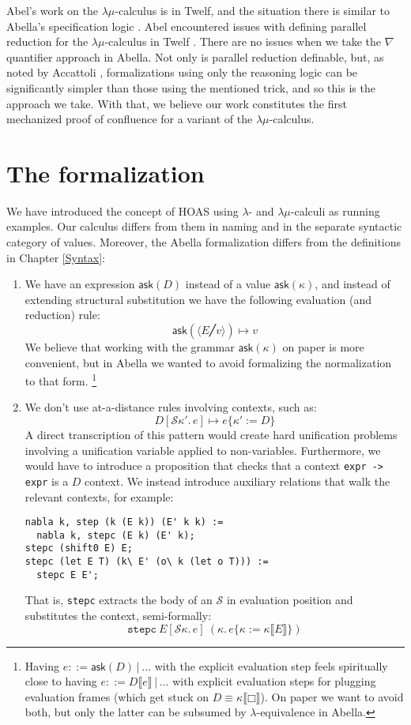 \documentclass[a4paper, 11pt,titlepage, openright, twoside]{report}
\newcommand{\Ask}{\textsf{ask}}
\newcommand{\subst}[2]{\{#1{:=}#2\}}
\renewcommand{\S}{\mathcal{S}}
\newcommand{\+}{\enspace}
\begin{document}
Abel's work on the $λμ$-calculus is in Twelf, and the situation there
is similar to Abella's specification logic%
.
Abel encountered issues with defining parallel reduction for the $λμ$-calculus in Twelf \cite{3rd}.
There are no issues when we take the $\nabla$ quantifier approach in Abella.
Not only is parallel reduction definable,
but, as noted by Accattoli \cite{pearl},
formalizations using only the reasoning logic
can be significantly simpler than those using the mentioned trick,
and so this is the approach we take.
With that, we believe our work constitutes the first mechanized proof of confluence for a variant of the $λμ$-calculus.

\section{The formalization}
We have introduced the concept of HOAS using $λ$- and $λμ$-calculi as running examples.
Our calculus differs from them in naming and in the separate syntactic category of values.
Moreover, the Abella formalization differs from the definitions in Chapter \ref{Syntax}:
\begin{enumerate}
	\item
		We have an expression $\Ask(D)$ instead of a value $\Ask(κ)$,
		and instead of extending structural substitution we have the following evaluation (and reduction) rule:
		$$\Ask(⟨E╱v⟩) ↦ v$$
		We believe that working with the grammar $\Ask(κ)$ on paper is more convenient,
		but in Abella we wanted to avoid formalizing the normalization to that form.%
		\footnote{
			Having $e ::= \Ask(D) │ ...$ with the explicit evaluation step feels spiritually close
			to having $e ::= D⟦e⟧ │ ...$ with explicit evaluation steps for plugging evaluation frames
			(which get stuck on $D ≡ κ⟦□⟧$).
			On paper we want to avoid both, but only the latter can be subsumed by $λ$-equivalence in Abella.
		}
	\item
		We don't use at-a-distance rules involving contexts, such as:
		$$D[\S κ'.\,e] ↦ e\subst{κ'}{D}$$
		A direct transcription of this pattern would create hard unification problems
		involving a unification variable applied to non-variables.
		Furthermore, we would have to introduce a proposition that checks
		that a context \lstinline{expr -> expr} is a $D$ context.
		We instead introduce auxiliary relations that walk the relevant contexts, for example:
		\begin{lstlisting}
nabla k, step (k (E k)) (E' k k) :=
  nabla k, stepc (E k) (E' k);
stepc (shift0 E) E;
stepc (let E T) (k\ E' (o\ k (let o T))) :=
  stepc E E';
		\end{lstlisting}
		That is, \lstinline{stepc} extracts the body of an $\S$ in evaluation position and substitutes the context, semi-formally:
		$$\texttt{stepc}\:E[\S κ.\,e] \:(κ.\,e\subst{κ}{κ⟦E⟧})$$
\end{enumerate}
\end{document}
